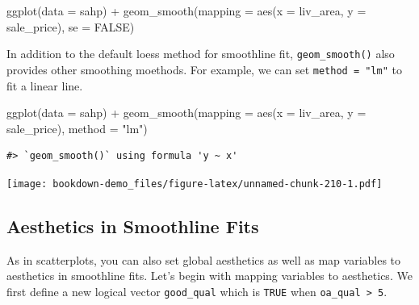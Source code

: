 \documentclass[
]{book}
\newenvironment{Shaded}{\begin{snugshade}}{\end{snugshade}}
\newcommand{\AttributeTok}[1]{\textcolor[rgb]{0.77,0.63,0.00}{#1}}
\newcommand{\ConstantTok}[1]{\textcolor[rgb]{0.00,0.00,0.00}{#1}}
\newcommand{\DecValTok}[1]{\textcolor[rgb]{0.00,0.00,0.81}{#1}}
\newcommand{\FunctionTok}[1]{\textcolor[rgb]{0.00,0.00,0.00}{#1}}
\newcommand{\NormalTok}[1]{#1}
\newcommand{\OtherTok}[1]{\textcolor[rgb]{0.56,0.35,0.01}{#1}}
\newcommand{\SpecialCharTok}[1]{\textcolor[rgb]{0.00,0.00,0.00}{#1}}
\newcommand{\StringTok}[1]{\textcolor[rgb]{0.31,0.60,0.02}{#1}}
\begin{document}
\begin{Shaded}
\begin{Highlighting}[]
\FunctionTok{ggplot}\NormalTok{(}\AttributeTok{data =}\NormalTok{ sahp) }\SpecialCharTok{+} \FunctionTok{geom\_smooth}\NormalTok{(}\AttributeTok{mapping =} \FunctionTok{aes}\NormalTok{(}\AttributeTok{x =}\NormalTok{ liv\_area, }\AttributeTok{y =}\NormalTok{ sale\_price), }\AttributeTok{se =} \ConstantTok{FALSE}\NormalTok{)}
\end{Highlighting}
\end{Shaded}

In addition to the default loess method for smoothline fit, \texttt{geom\_smooth()} also provides other smoothing moethods. For example, we can set \texttt{method\ =\ "lm"} to fit a linear line.

\begin{Shaded}
\begin{Highlighting}[]
\FunctionTok{ggplot}\NormalTok{(}\AttributeTok{data =}\NormalTok{ sahp) }\SpecialCharTok{+} \FunctionTok{geom\_smooth}\NormalTok{(}\AttributeTok{mapping =} \FunctionTok{aes}\NormalTok{(}\AttributeTok{x =}\NormalTok{ liv\_area, }\AttributeTok{y =}\NormalTok{ sale\_price), }\AttributeTok{method =} \StringTok{"lm"}\NormalTok{)}
\end{Highlighting}
\end{Shaded}

\begin{verbatim}
#> `geom_smooth()` using formula 'y ~ x'
\end{verbatim}

\texttt{[image: bookdown-demo\_files/figure-latex/unnamed-chunk-210-1.pdf]}

\hypertarget{aesthetics-in-smoothline-fits}{%
\subsection{Aesthetics in Smoothline Fits}\label{aesthetics-in-smoothline-fits}}

As in scatterplots, you can also set global aesthetics as well as map variables to aesthetics in smoothline fits. Let's begin with mapping variables to aesthetics. We first define a new logical vector \texttt{good\_qual} which is \texttt{TRUE} when \texttt{oa\_qual\ \textgreater{}\ 5}.

\begin{Shaded}
\end{Shaded}
\end{document}
